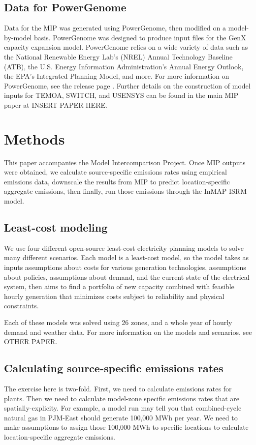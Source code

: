\documentclass[a4paper]{article}
\theoremstyle{definition}
\theoremstyle{plain}
\begin{document}
\subsection{Data for PowerGenome}
Data for the MIP was generated using PowerGenome, then modified on a model-by-model basis.  PowerGenome was designed to produce input files for the GenX capacity expansion model.  PowerGenome relies on a wide variety of data such as the National Renewable Energy Lab's (NREL) Annual Technology Baseline (ATB), the U.S. Energy Information Administration's Annual Energy Outlook, the EPA's Integrated Planning Model, and more.  For more information on PowerGenome, see the release page \citep{SchivleyPowerGenome/PowerGenome:V0.6.3}.  Further details on the construction of model inputs for TEMOA, SWITCH, and USENSYS can be found in the main MIP paper at INSERT PAPER HERE.

\section{Methods}
This paper accompanies the Model Intercomparison Project. Once MIP outputs were obtained, we calculate source-specific emissions rates using empirical emissions data, downscale the results from MIP to predict location-specific aggregate emissions, then finally, run those emissions through the InMAP ISRM model. 


\subsection{Least-cost modeling}
We use four different open-source least-cost electricity planning models to solve many different scenarios. Each model is a least-cost model, so the model takes as inputs assumptions about costs for various generation technologies, assumptions about policies, assumptions about demand, and the current state of the electrical system, then aims to find a portfolio of new capacity combined with feasible hourly generation that minimizes costs subject to reliability and physical constraints.

Each of these models was solved using 26 zones, and a whole year of hourly demand and weather data.  For more information on the models and scenarios, see OTHER PAPER.


\subsection{Calculating source-specific emissions rates}
The exercise here is two-fold.  First, we need to calculate emissions rates for plants.  Then we need to calculate model-zone specific emissions rates that are spatially-explicity.  For example, a model run may tell you that combined-cycle natural gas in PJM-East should generate 100,000 MWh per year.  We need to make assumptions to assign those 100,000 MWh to specific locations to calculate location-specific aggregate emissions.
\end{document}
